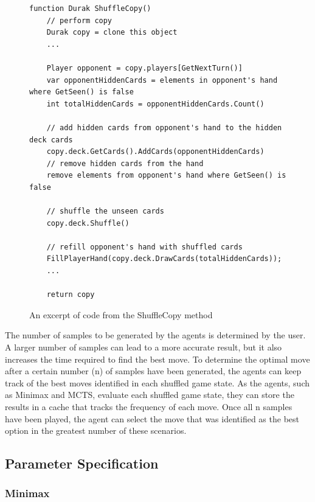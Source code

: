 \begin{figure}[h]
\captionsetup{justification=centering}
\begin{lstlisting}
function Durak ShuffleCopy()
    // perform copy
    Durak copy = clone this object
    ...
    
    Player opponent = copy.players[GetNextTurn()]
    var opponentHiddenCards = elements in opponent's hand where GetSeen() is false
    int totalHiddenCards = opponentHiddenCards.Count()

    // add hidden cards from opponent's hand to the hidden deck cards
    copy.deck.GetCards().AddCards(opponentHiddenCards)
    // remove hidden cards from the hand
    remove elements from opponent's hand where GetSeen() is false
    
    // shuffle the unseen cards 
    copy.deck.Shuffle()
    
    // refill opponent's hand with shuffled cards
    FillPlayerHand(copy.deck.DrawCards(totalHiddenCards));
    ...
    
    return copy
\end{lstlisting}
\caption{ An excerpt of code from the ShuffleCopy method}
\label{fig:shuffleCopy}
\end{figure}

The number of samples to be generated by the agents is determined by the user. A larger number of samples can lead to a more accurate result, but it also increases the time required to find the best move. To determine the optimal move after a certain number (n) of samples have been generated, the agents can keep track of the best moves identified in each shuffled game state. As the agents, such as Minimax and MCTS, evaluate each shuffled game state, they can store the results in a cache that tracks the frequency of each move. Once all n samples have been played, the agent can select the move that was identified as the best option in the greatest number of these scenarios.

\subsection{Parameter Specification}
\label{paramSpecification}

\subsubsection{Minimax}


